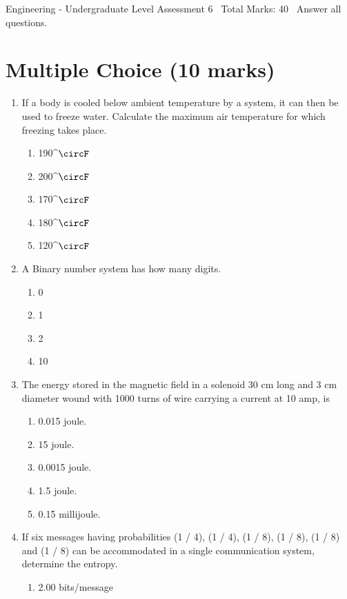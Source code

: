 \documentclass[12pt]{article}
\begin{document}
\begin{center}
Engineering - Undergraduate Level Assessment 6 \
Total Marks: 40 \
Answer all questions.
\end{center}

\section*{Multiple Choice (10 marks)}
\begin{enumerate}[label=\arabic*.]
\item If a body is cooled below ambient temperature by a system, it can then be used to freeze water. Calculate the maximum air temperature for which freezing takes place.
\begin{enumerate}[label=(\alph*)]
    \item 190^\ensuremath{\circF}
    \item 200^\ensuremath{\circF}
    \item 170^\ensuremath{\circF}
    \item 180^\ensuremath{\circF}
    \item 120^\ensuremath{\circF}
\end{enumerate}
\item A Binary number system has how many digits.
\begin{enumerate}[label=(\alph*)]
    \item 0
    \item 1
    \item 2
    \item 10
\end{enumerate}
\item The energy stored in the magnetic field in a solenoid 30 cm long and 3 cm diameter wound with 1000 turns of wire carrying a current at 10 amp, is
\begin{enumerate}[label=(\alph*)]
    \item 0.015 joule.
    \item 15 joule.
    \item 0.0015 joule.
    \item 1.5 joule.
    \item 0.15 millijoule.
\end{enumerate}
\item If six messages having probabilities (1 / 4), (1 / 4), (1 / 8), (1 / 8), (1 / 8) and (1 / 8) can be accommodated in a single communication system, determine the entropy.
\begin{enumerate}[label=(\alph*)]
    \item 2.00 bits/message

\end{enumerate}
\end{enumerate}
\end{document}
